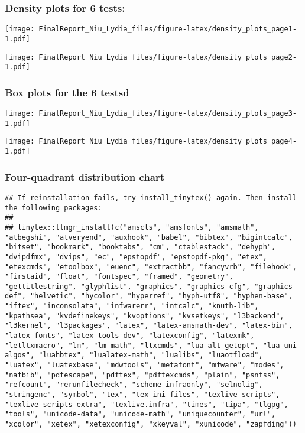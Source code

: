 \documentclass[
]{article}
\begin{document}
\subsubsection{Density plots for 6
tests:}\label{density-plots-for-6-tests}

\newline

\texttt{[image: FinalReport\_Niu\_Lydia\_files/figure-latex/density\_plots\_page1-1.pdf]}

\texttt{[image: FinalReport\_Niu\_Lydia\_files/figure-latex/density\_plots\_page2-1.pdf]}

\subsubsection{Box plots for the 6
testsd}\label{box-plots-for-the-6-testsd}

\texttt{[image: FinalReport\_Niu\_Lydia\_files/figure-latex/density\_plots\_page3-1.pdf]}

\texttt{[image: FinalReport\_Niu\_Lydia\_files/figure-latex/density\_plots\_page4-1.pdf]}

\subsubsection{Four-quadrant distribution
chart}\label{four-quadrant-distribution-chart}

\begin{verbatim}
## If reinstallation fails, try install_tinytex() again. Then install the following packages:
## 
## tinytex::tlmgr_install(c("amscls", "amsfonts", "amsmath", "atbegshi", "atveryend", "auxhook", "babel", "bibtex", "bigintcalc", "bitset", "bookmark", "booktabs", "cm", "ctablestack", "dehyph", "dvipdfmx", "dvips", "ec", "epstopdf", "epstopdf-pkg", "etex", "etexcmds", "etoolbox", "euenc", "extractbb", "fancyvrb", "filehook", "firstaid", "float", "fontspec", "framed", "geometry", "gettitlestring", "glyphlist", "graphics", "graphics-cfg", "graphics-def", "helvetic", "hycolor", "hyperref", "hyph-utf8", "hyphen-base", "iftex", "inconsolata", "infwarerr", "intcalc", "knuth-lib", "kpathsea", "kvdefinekeys", "kvoptions", "kvsetkeys", "l3backend", "l3kernel", "l3packages", "latex", "latex-amsmath-dev", "latex-bin", "latex-fonts", "latex-tools-dev", "latexconfig", "latexmk", "letltxmacro", "lm", "lm-math", "ltxcmds", "lua-alt-getopt", "lua-uni-algos", "luahbtex", "lualatex-math", "lualibs", "luaotfload", "luatex", "luatexbase", "mdwtools", "metafont", "mfware", "modes", "natbib", "pdfescape", "pdftex", "pdftexcmds", "plain", "psnfss", "refcount", "rerunfilecheck", "scheme-infraonly", "selnolig", "stringenc", "symbol", "tex", "tex-ini-files", "texlive-scripts", "texlive-scripts-extra", "texlive.infra", "times", "tipa", "tlgpg", "tools", "unicode-data", "unicode-math", "uniquecounter", "url", "xcolor", "xetex", "xetexconfig", "xkeyval", "xunicode", "zapfding"))
\end{verbatim}
\end{document}

